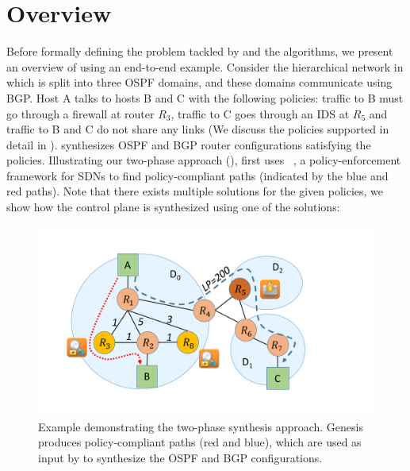 \section{Overview}
Before formally defining the problem tackled by \name and the algorithms, 
we present an overview of \name using an end-to-end
example. Consider the hierarchical network in  which
is split into three OSPF domains, and these domains communicate
using BGP. Host A talks to hosts B and C with the following policies:
traffic to B must go through a firewall at router $R_3$, traffic to C 
goes through an IDS at $R_5$ and traffic 
to B and C do not share any links (We discuss the policies supported in
detail in ). \name 
synthesizes OSPF and BGP router configurations satisfying the 
policies. Illustrating our two-phase approach (), 
\name first uses \genesis~\cite{genesis}, a policy-enforcement framework for SDNs 
to find policy-compliant paths (indicated by the blue and
red paths). Note that there exists multiple solutions for the given
policies, we show how the control plane is synthesized using one of the solutions:
\begin{figure}
	\includegraphics[width=0.5\columnwidth]{figures/example.pdf}
	\caption{Example demonstrating the two-phase synthesis approach. 
	Genesis produces policy-compliant paths (red and blue), 
	which are used as input by \name to
	synthesize the OSPF and BGP configurations.}
	\label{fig:example}
\end{figure}

